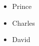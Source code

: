 \documentclass{article}
\begin{document}
	\begin{itemize}
		\item Prince
		\item Charles
		\item David
	\end{itemize}
\end{document}
